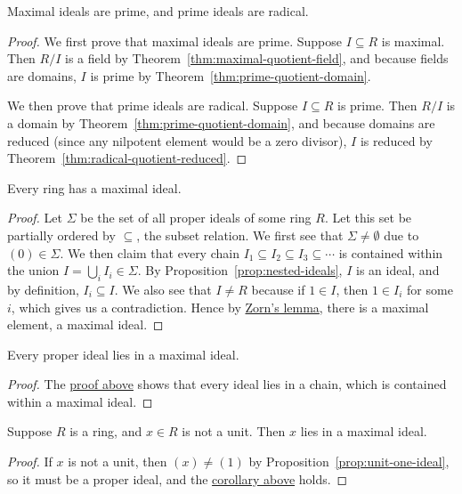 \begin{theorem}
    Maximal ideals are prime, and prime ideals are radical.
\end{theorem}
\begin{proof}
    We first prove that maximal ideals are prime.
    Suppose \(I \subseteq R\) is maximal.
    Then \(R/I\) is a field by Theorem~\ref{thm:maximal-quotient-field},
    and because fields are domains,
    \(I\) is prime by Theorem~\ref{thm:prime-quotient-domain}.

    We then prove that prime ideals are radical.
    Suppose \(I \subseteq R\) is prime.
    Then \(R/I\) is a domain by Theorem~\ref{thm:prime-quotient-domain},
    and because domains are reduced (since any nilpotent element would be a zero divisor),
    \(I\) is reduced by Theorem~\ref{thm:radical-quotient-reduced}.
\end{proof}

\begin{theorem}\label{thm:maximal-ideal-exists}\label{thm:krull}
    Every ring has a maximal ideal.
\end{theorem}
\begin{proof}
    Let \(\Sigma\) be the set of all proper ideals of some ring \(R\).
    Let this set be partially ordered by \(\subseteq\), the subset relation.
    We first see that \(\Sigma\neq\emptyset\) due to \((0) \in \Sigma\).
    We then claim that every chain \(I_1 \subseteq I_2 \subseteq I_3 \subseteq \cdots\)
    is contained within the union \(I = \bigcup_i I_i \in \Sigma\).
    By Proposition~\ref{prop:nested-ideals}, \(I\) is an ideal,
    and by definition, \(I_i \subseteq I\).
    We also see that \(I \neq R\) because if \(1 \in I\),
    then \(1 \in I_i\) for some \(i\), which gives us a contradiction.
    Hence by \hyperref[ax:zorn]{Zorn's lemma}, there is a maximal element, a maximal ideal.
\end{proof}
\begin{corollary}\label{cor:proper-in-maximal}
    Every proper ideal lies in a maximal ideal.
\end{corollary}
\begin{proof}
    The \hyperref[thm:maximal-ideal-exists]{proof above} shows that
    every ideal lies in a chain,
    which is contained within a maximal ideal.
\end{proof}
\begin{corollary}
    Suppose \(R\) is a ring, and \(x \in R\) is not a unit.
    Then \(x\) lies in a maximal ideal.
\end{corollary}
\begin{proof}
    If \(x\) is not a unit,
    then \((x) \neq (1)\) by Proposition~\ref{prop:unit-one-ideal},
    so it must be a proper ideal,
    and the \hyperref[cor:proper-in-maximal]{corollary above} holds.
\end{proof}

